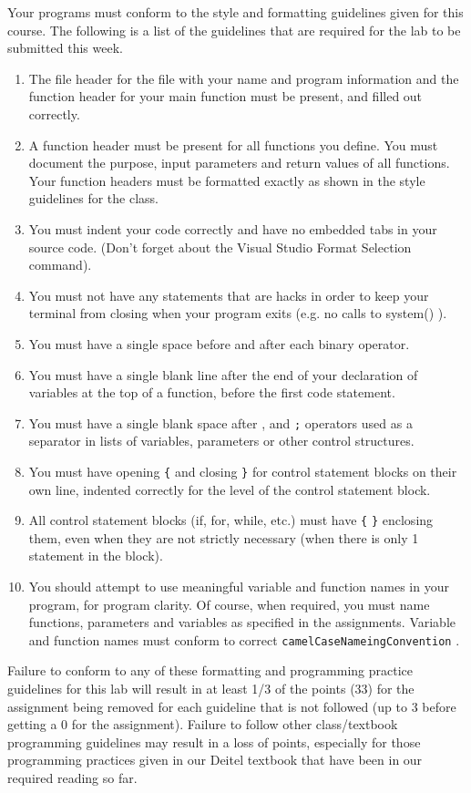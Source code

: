 \documentclass[11pt]{article}
\begin{document}
Your programs must conform to the style and formatting guidelines given for this course.
The following is a list of the guidelines that are required for the lab to be submitted
this week.

\begin{enumerate}
\item The file header for the file with your name and program information
  and the function header for your main function must be present, and
  filled out correctly.
\item A function header must be present for all functions you define.
   You must document the purpose, input parameters and return values
   of all functions.  Your function headers must be formatted exactly
   as shown in the style guidelines for the class.
\item You must indent your code correctly and have no embedded tabs in
  your source code. (Don't forget about the Visual Studio Format
  Selection command).
\item You must not have any statements that are hacks in order to keep
   your terminal from closing when your program exits (e.g. no calls
   to system() ).
\item You must have a single space before and after each binary operator.
\item You must have a single blank line after the end of your declaration
  of variables at the top of a function, before the first code
  statement.
\item You must have a single blank space after , and \verb~;~ operators used as a
  separator in lists of variables, parameters or other control
  structures.
\item You must have opening \verb~{~ and closing \verb~}~ for control statement blocks
  on their own line, indented correctly for the level of the control
  statement block.
\item All control statement blocks (if, for, while, etc.) must have \verb~{~
   \verb~}~ enclosing them, even when they are not strictly necessary
   (when there is only 1 statement in the block).
\item You should attempt to use meaningful variable and function names in
   your program, for program clarity.  Of course, when required, you
   must name functions, parameters and variables as specified in the
   assignments.  Variable and function names must conform to correct
   \verb~camelCaseNameingConvention~ .
\end{enumerate}

Failure to conform to any of these formatting and programming practice
guidelines for this lab will result in at least 1/3 of the points (33)
for the assignment being removed for each guideline that is not
followed (up to 3 before getting a 0 for the assignment). Failure to
follow other class/textbook programming guidelines may result in a
loss of points, especially for those programming practices given in
our Deitel textbook that have been in our required reading so far.
\end{document}
